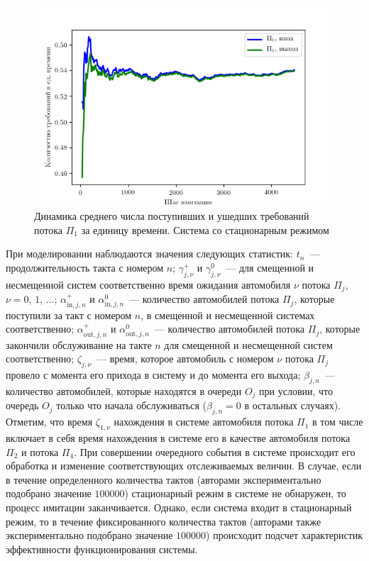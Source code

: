 \begin{figure}[t]
\centering
\includegraphics[scale=1]{Dissertation/Work_structured/Pictures/pic_inputOutputFirstFlow_stationar.png}
\caption{Динамика среднего числа поступивших и ушедших требований потока $\Pi_1$  за единицу времени. Система со стационарным режимом}
\label{Experiment:inputOutputFirstFlow:stationar}
\end{figure}
 При моделировании наблюдаются значения следующих статистик: $t_n$~--- продолжительность такта с номером $n$; $\gamma_{j,\nu}^+$ и $\gamma_{j,\nu}^0$~--- для смещенной и несмещенной систем соответственно время ожидания  автомобиля $\nu$ потока $\Pi_j$, $\nu=0$, $1$, $\ldots$;
 $\alpha^{+}_{\text{in},j,n}$ и $\alpha^{0}_{\text{in}, j,n}$~--- количество автомобилей потока $\Pi_j$, которые поступили за такт с номером $n$, в смещенной и несмещенной системах соответственно; 
 $\alpha^{+}_{\text{out},j,n}$ и $\alpha^{0}_{\text{out},j,n}$~--- количество автомобилей потока $\Pi_j$, которые закончили обслуживание на такте $n$ для смещенной и несмещенной систем соответственно;  $\zeta_{j,\nu}$~--- время, которое автомобиль с номером $\nu$ потока $\Pi_j$ провело с момента его прихода в систему и до момента его выхода; $\beta_{j,n}$~--- количество автомобилей, которые находятся в очереди $O_j$ при условии, что  очередь $O_j$ только что начала обслуживаться ($\beta_{j,n}=0$ в остальных случаях). Отметим, что время $\zeta_{1,\nu}$ нахождения в системе автомобиля потока $\Pi_1$ в том числе включает в себя время нахождения в системе его в качестве автомобиля потока $\Pi_2$ и потока $\Pi_4$. При совершении очередного события в системе происходит его обработка и изменение соответствующих отслеживаемых величин. В случае, если в течение определенного количества тактов (авторами экспериментально подобрано значение $100000$) стационарный режим в системе не обнаружен, то процесс имитации заканчивается. Однако, если система входит в стационарный режим, то в течение фиксированного количества тактов (авторами также экспериментально подобрано значение $100000$) происходит подсчет характеристик эффективности функционирования системы.




